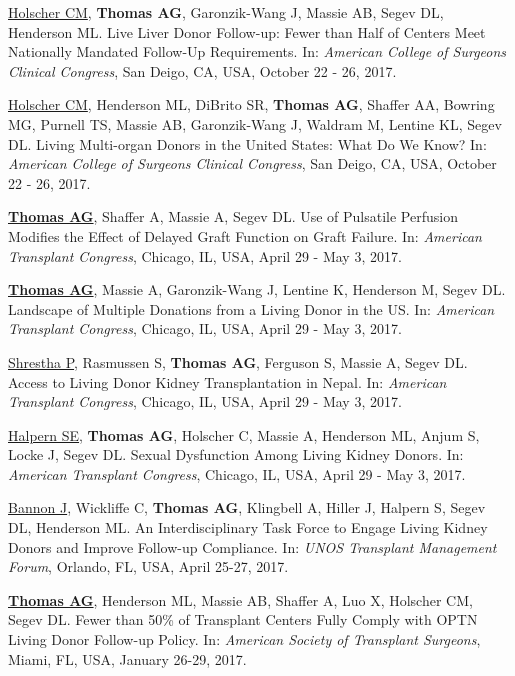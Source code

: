 \documentclass[10pt]{article}
\begin{document}
\begin{bibenum}
\item \underline{Holscher CM}, \textbf{Thomas AG}, Garonzik-Wang J,
  Massie AB, Segev DL, Henderson ML. Live Liver Donor Follow-up: Fewer
  than Half of Centers Meet Nationally Mandated Follow-Up Requirements.
  In: \emph{American College of Surgeons Clinical Congress},
  San Deigo, CA, USA, October 22 - 26, 2017.

\item \underline{Holscher CM}, Henderson ML, DiBrito SR, \textbf{Thomas AG},
  Shaffer AA, Bowring MG, Purnell TS, Massie AB, Garonzik-Wang J,
  Waldram M, Lentine KL, Segev DL. Living Multi-organ Donors in the
  United States: What Do We Know?
  In: \emph{American College of Surgeons Clinical Congress},
  San Deigo, CA, USA, October 22 - 26, 2017.

\item \underline{\textbf{Thomas AG}}, Shaffer A, Massie A, Segev DL.
  Use of Pulsatile Perfusion Modifies the Effect of
  Delayed Graft Function on Graft Failure.
  In: \emph{American Transplant Congress},
  Chicago, IL, USA, April 29 - May 3, 2017.

\item \underline{\textbf{Thomas AG}}, Massie A, Garonzik-Wang J,
  Lentine K, Henderson M, Segev DL.
  Landscape of Multiple Donations from a Living Donor in the US.
  In: \emph{American Transplant Congress},
  Chicago, IL, USA, April 29 - May 3, 2017.

\item \underline{Shrestha P}, Rasmussen S, \textbf{Thomas AG},
  Ferguson S, Massie A, Segev DL.
  Access to Living Donor Kidney Transplantation in Nepal.
  In: \emph{American Transplant Congress},
  Chicago, IL, USA, April 29 - May 3, 2017.

\item \underline{Halpern SE}, \textbf{Thomas AG}, Holscher C, Massie A,
  Henderson ML, Anjum S, Locke J, Segev DL.
  Sexual Dysfunction Among Living Kidney Donors.
  In: \emph{American Transplant Congress},
  Chicago, IL, USA, April 29 - May 3, 2017.

\item \underline{Bannon J}, Wickliffe C, \textbf{Thomas AG}, Klingbell A,
  Hiller J, Halpern S, Segev DL, Henderson ML.
  An Interdisciplinary Task Force to Engage Living Kidney
  Donors and Improve Follow-up Compliance.
  In: \emph{UNOS Transplant Management Forum},
  Orlando, FL, USA, April 25-27, 2017.

\item \underline{\textbf{Thomas AG}}, Henderson ML, Massie AB, Shaffer A,
  Luo X, Holscher CM, Segev DL. Fewer than 50\% of Transplant Centers Fully
  Comply with OPTN Living Donor Follow-up Policy.
  In: \emph{American Society of Transplant Surgeons},
  Miami, FL, USA, January 26-29, 2017.


\end{bibenum}
\end{document}
